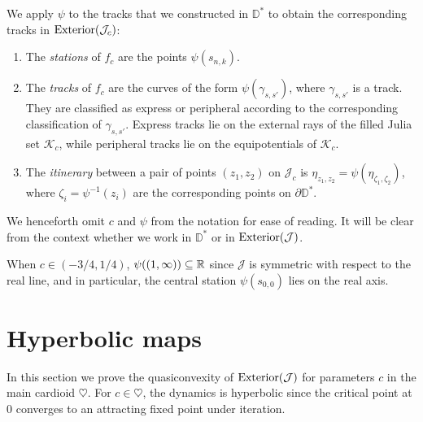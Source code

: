 We apply $\psi$ to the tracks that we constructed in $\mathbb D^*$ 
to obtain the corresponding tracks in $\operatorname{Exterior}(\mathcal{J}_c)$:
\begin{definition} \leavevmode
\begin{enumerate}
	\item The 	\emph{stations} of $f_c$ are the points $\psi(s_{n,k})$.


\item The \emph{tracks} of $f_c$ are the curves of the form $\psi (\gamma_{s,s'})$, where $\gamma_{s,s'}$ is a track. They are classified as express or peripheral according to the corresponding classification of $\gamma_{s,s'}$. 
Express tracks lie on the external rays of the filled Julia set $\mathcal K_c$, while peripheral tracks lie on the equipotentials of $\mathcal K_c$.

\item The \emph{itinerary} between a pair of points $(z_1,z_2)$ on $\mathcal J_c$ is
$\eta_{z_1,z_2}=\psi(\eta_{\zeta_1,\zeta_2})$, 
where $\zeta_i=\psi^{-1}(z_i)$ are the corresponding points on $\partial \mathbb D^*$. 
\end{enumerate}

We henceforth omit $c$ and $\psi$ from the notation for ease of reading. It will be clear from the context whether we work in $\mathbb D^*$ or in $\operatorname{Exterior}(\mathcal J)$.

\end{definition}

When $c \in (-3/4, 1/4)$, $\psi ((1,\infty))\subseteq\mathbb{R}$ since $\mathcal{J}$ is symmetric with respect to the real line, and in particular, the central station $\psi(s_{0,0})$ lies on the real axis.


\section{Hyperbolic maps}
In this section we prove the quasiconvexity of $\operatorname{Exterior}(\mathcal J)$ for parameters $c$ in the main cardioid $\heartsuit$. For $c \in \heartsuit$, the dynamics is hyperbolic since the critical point at 0 converges to an attracting fixed point under iteration.


